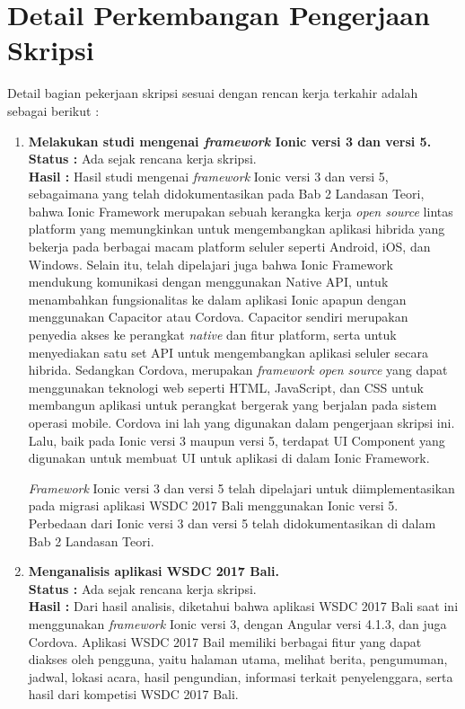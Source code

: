 \documentclass[a4paper,twoside]{article}
\begin{document}
\section{Detail Perkembangan Pengerjaan Skripsi}
Detail bagian pekerjaan skripsi sesuai dengan rencan kerja terkahir adalah sebagai berikut :	
	\begin{enumerate}
		\item \textbf{Melakukan studi mengenai \textit{framework} Ionic versi 3 dan versi 5.} \\
		{\bf Status :} Ada sejak rencana kerja skripsi.\\
		{\bf Hasil :} Hasil studi mengenai \textit{framework} Ionic versi 3 dan versi 5, sebagaimana yang telah didokumentasikan pada Bab 2 Landasan Teori, bahwa Ionic Framework merupakan sebuah kerangka kerja \textit{open source} lintas platform yang memungkinkan untuk mengembangkan aplikasi hibrida yang bekerja pada berbagai macam platform seluler seperti Android, iOS, dan Windows. Selain itu, telah dipelajari juga bahwa Ionic Framework mendukung komunikasi dengan menggunakan Native API, untuk menambahkan fungsionalitas ke dalam aplikasi Ionic apapun dengan menggunakan Capacitor atau Cordova. Capacitor sendiri merupakan penyedia akses ke perangkat \textit{native} dan fitur platform, serta untuk menyediakan satu set API untuk mengembangkan aplikasi seluler secara hibrida. Sedangkan Cordova, merupakan \textit{framework open source} yang dapat menggunakan teknologi web seperti HTML, JavaScript, dan CSS untuk membangun aplikasi untuk perangkat bergerak yang berjalan pada sistem operasi mobile. Cordova ini lah yang digunakan dalam pengerjaan skripsi ini. Lalu, baik pada Ionic versi 3 maupun versi 5, terdapat UI Component yang digunakan untuk membuat UI untuk aplikasi di dalam Ionic Framework.
		
		\textit{Framework} Ionic versi 3 dan versi 5 telah dipelajari untuk diimplementasikan pada migrasi aplikasi WSDC 2017 Bali menggunakan Ionic versi 5. Perbedaan dari Ionic versi 3 dan versi 5 telah didokumentasikan di dalam Bab 2 Landasan Teori.
		
		\item \textbf{Menganalisis aplikasi WSDC 2017 Bali.}\\
		{\bf Status :} Ada sejak rencana kerja skripsi.\\
		{\bf Hasil :} Dari hasil analisis, diketahui bahwa aplikasi WSDC 2017 Bali saat ini menggunakan \textit{framework} Ionic versi 3, dengan Angular versi 4.1.3, dan juga Cordova. Aplikasi WSDC 2017 Bail memiliki berbagai fitur yang dapat diakses oleh pengguna, yaitu halaman utama, melihat berita, pengumuman, jadwal, lokasi acara, hasil pengundian, informasi terkait penyelenggara, serta hasil dari kompetisi WSDC 2017 Bali. 
		

\end{enumerate}
\end{document}

